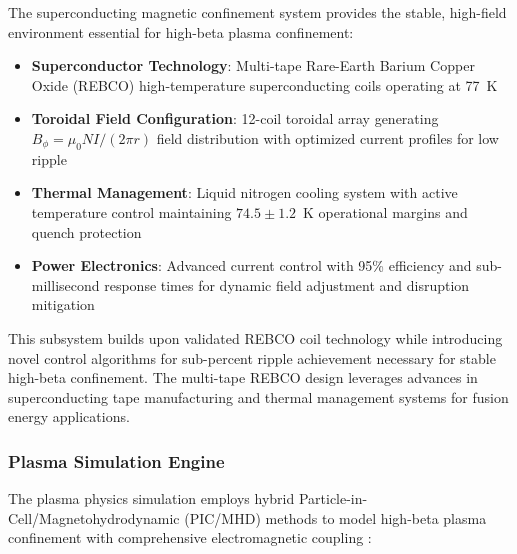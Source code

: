 \documentclass[10pt,twocolumn]{article}
\begin{document}
The superconducting magnetic confinement system provides the stable, high-field environment essential for high-beta plasma confinement:

\begin{itemize}
\item \textbf{Superconductor Technology}: Multi-tape Rare-Earth Barium Copper Oxide (REBCO) high-temperature superconducting coils operating at 77~K
\item \textbf{Toroidal Field Configuration}: 12-coil toroidal array generating $B_\phi = \mu_0 NI/(2\pi r)$ field distribution with optimized current profiles for low ripple
\item \textbf{Thermal Management}: Liquid nitrogen cooling system with active temperature control maintaining $74.5 \pm 1.2$~K operational margins and quench protection
\item \textbf{Power Electronics}: Advanced current control with 95\% efficiency and sub-millisecond response times for dynamic field adjustment and disruption mitigation
\end{itemize}

This subsystem builds upon validated REBCO coil technology \cite{senatore2014progress} while introducing novel control algorithms for sub-percent ripple achievement necessary for stable high-beta confinement. The multi-tape REBCO design leverages advances in superconducting tape manufacturing and thermal management systems \cite{chen2016plasma,freidberg2014plasma} for fusion energy applications.

\subsubsection{Plasma Simulation Engine}

The plasma physics simulation employs hybrid Particle-in-Cell/Magnetohydrodynamic (PIC/MHD) methods to model high-beta plasma confinement with comprehensive electromagnetic coupling \cite{freidberg2014plasma}:
\end{document}
